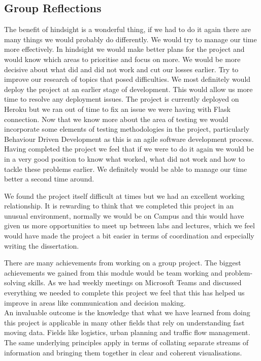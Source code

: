 \subsection{Group Reflections}
The benefit of hindsight is a wonderful thing, if we had to do it again there are many things we would probably do differently.
We would try to manage our time more effectively. In hindsight we would make better plans for the project and would know which areas to prioritise and focus on more. We would be more decisive about what did and did not work and cut our losses earlier. Try to improve our research of topics that posed difficulties.
We most definitely would deploy the project at an earlier stage of development. This would allow us more time to resolve any deployment issues. The project is currently deployed on Heroku but we ran out of time to fix an issue we were having with Flask connection. Now that we know more about the area of testing we would incorporate some elements of testing methodologies in the project, particularly Behaviour Driven Development as this is an agile software development process. 
Having completed the project we feel that if we were to do it again we would be in a very good position to know what worked, what did not work and how to tackle these problems earlier. We definitely would be able to manage our time better a second time around.\\
\vspace{5mm}

We found the project itself difficult at times but we had an excellent working relationship. It is rewarding to think that we completed this project in an unusual environment, normally we would be on Campus and this would have given us more opportunities to meet up between labs and lectures, which we feel would have made the project a bit easier in terms of coordination and especially writing the dissertation.

There are many achievements from working on a group project. The biggest achievements we gained from this module would be team working and problem-solving skills. As we had weekly meetings on Microsoft Teams and discussed everything we needed to complete this project we feel that this has helped us improve in areas like communication and decision making.\\
An invaluable outcome is the knowledge that what we have learned from doing this project is applicable in many other fields that rely on understanding fast moving data. Fields like logistics, urban planning and traffic flow management. The same underlying principles apply in terms of collating separate streams of information and bringing them together in clear and coherent visualisations. 
\vspace{5mm}

